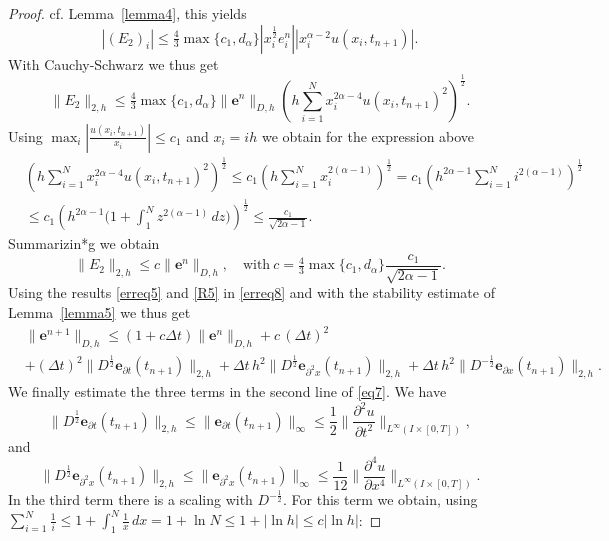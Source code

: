 \documentclass{siamltex}
\newcommand{\be}{\mathbf e}
\begin{document}
{\begin{proof}
cf. Lemma~\ref{lemma4},  this yields
\[
 |(E_2)_i| \leq \tfrac43 \max\{c_1, d_\alpha\} |x_i^\frac12 e_i^n| |x_i^{\alpha-2}u(x_i,t_{n+1})|.
\]
With Cauchy-Schwarz we thus get
\begin{equation} \label{estE2}
 \|E_2\|_{2,h} \leq  \tfrac43 \max\{c_1, d_\alpha\} \|\be^n\|_{D,h} \left(h \sum_{i=1}^N x_i^{2\alpha-4} u(x_i,t_{n+1})^2 \right)^\frac12.
\end{equation}
Using $ \max_{i}|\frac{u(x_i,t_{n+1})}{x_i}| \leq c_1$ and $x_i=ih$  we obtain for the expression above
\begin{align*} 
  & \left(h \sum_{i=1}^N x_i^{2\alpha-4} u(x_i,t_{n+1})^2 \right)^\frac12 \leq c_1 \left(h \sum_{i=1}^N x_i^{2(\alpha-1)}  \right)^\frac12=c_1 \left(h^{2 \alpha -1} \sum_{i=1}^N i^{2(\alpha-1)}  \right)^\frac12 \nonumber \\
 & \leq c_1 \left(h^{2 \alpha -1}\big( 1+ \int_1^{N} z^{2 (\alpha-1)}\, dz \big) \right)^\frac12 \leq \frac{c_1}{\sqrt{2 \alpha -1}}.
\end{align*}
Summarizin*g we obtain
\begin{equation} \label{R5}
   \|E_2\|_{2,h} \leq c \|\be^n\|_{D,h}, \quad \text{with}~ c= \tfrac43 \max\{c_1, d_\alpha\}\frac{c_1}{\sqrt{2 \alpha -1}}.
\end{equation}
Using  the results \eqref{erreq5} and \eqref{R5} in \eqref{erreq8} and with the stability estimate of Lemma~\ref{lemma5} we thus get  
\begin{equation}\label{eq7} \begin{split}
 & \|\be^{n+1}\|_{D,h} \leq (1 + c \Delta t)\|\be^n\|_{D,h} + c\, (\Delta t)^2 \\
  & + (\Delta t)^2 \|D^\frac12 \be_{\partial t}(t_{n+1})\|_{2,h} +  \Delta t\, h^2\| D^\frac12\be_{\partial^2 x}(t_{n+1})\|_{2,h}+ \Delta t\, h^2 \|D^{-\frac12}\be_{\partial x}(t_{n+1})\|_{2,h}.
\end{split} \end{equation}
We finally estimate the three terms in the second line of \eqref{eq7}. We have
\[ \|D^\frac12 \be_{\partial t}(t_{n+1})\|_{2,h} \leq \|\be_{\partial t}(t_{n+1})\|_\infty \leq \frac12 \| \frac{\partial^2 u}{\partial t^2}\|_{L^\infty(I\times[0,T])},
\]
and  
\[
 \| D^\frac12\be_{\partial^2 x}(t_{n+1})\|_{2,h} \leq \| \be_{\partial^2 x}(t_{n+1})\|_\infty \leq \frac{1}{12}\|\frac{\partial^4 u}{\partial  x^4}\|_{L^\infty(I\times[0,T])}.
\]
In  the third term there is a scaling with $D^{-\frac12}$. For this term we obtain, using $\sum_{i=1}^N \frac{1}{i} \leq 1 +\int_1^N \frac{1}{x} \, dx = 1 + \ln N \leq 1 + |\ln h| \leq c |\ln h|$:

\end{proof}}
\end{document}
